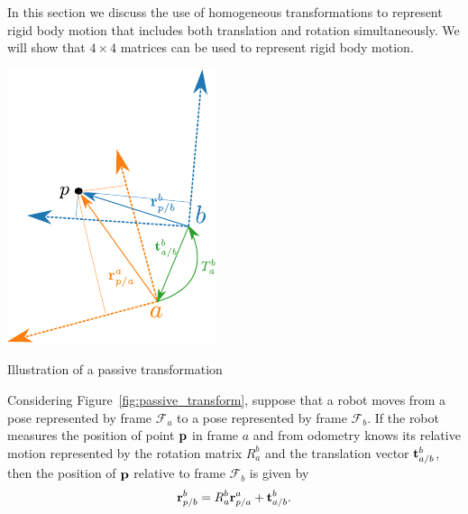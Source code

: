 In this section we discuss the use of homogeneous transformations to represent rigid body motion that includes both translation and rotation simultaneously.  We will show that $4\times 4$ matrices can be used to represent rigid body motion.
%
\begin{marginfigure}[-2in]
\includegraphics[width=\linewidth]{chap2_preliminaries/figures/transform_passive}
\caption{Illustration of a passive transformation}
\label{fig:passive_transform}
\end{marginfigure}
Considering Figure~\ref{fig:passive_transform}, 
suppose that a robot moves from a pose represented by frame $\mathcal{F}_a$ to a pose represented by frame $\mathcal{F}_b$.  If the robot measures the position of point $\mathbf{p}$ in frame $a$ and from odometry knows its relative motion represented by the rotation matrix $R_a^b$ and the translation vector $\mathbf{t}_{a/b}^b$, then the position of $\mathbf{p}$ relative to frame $\mathcal{F}_b$ is given by
\begin{equation}\label{eq:homogenenous_1}
\rbf_{p/b}^b = R_a^b \rbf_{p/a}^a + \tbf_{a/b}^b.
\end{equation}
